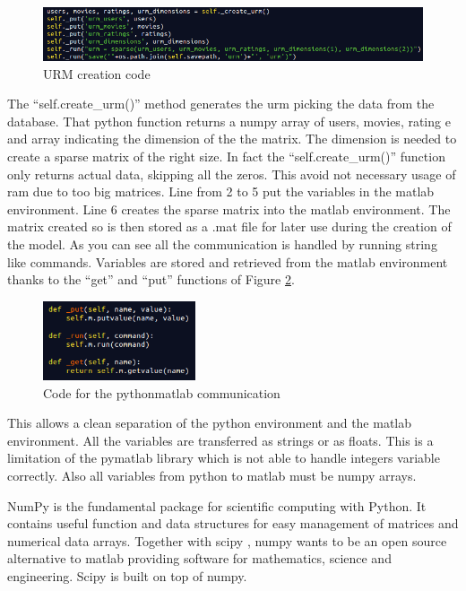 \begin{figure}
  \centering
  \includegraphics[width=\textwidth]{figures/urm_creation_code.png}
  \caption{URM creation code}
  \label{fig:urm_creation_code}
\end{figure}

The ``self.create\_urm()'' method generates the urm picking the data from the database. That python function returns a numpy array of users, movies, rating e and array indicating the dimension of the the matrix. The dimension is needed to create a sparse matrix of the right size. In fact the ``self.create\_urm()'' function only returns actual data, skipping all the zeros. This avoid not necessary usage of ram due to too big matrices. Line from 2 to 5 put the variables in the matlab environment. Line 6 creates the sparse matrix into the matlab environment. The matrix created so is then stored as a .mat file for later use during the creation of the model.
As you can see all the communication is handled by running string like commands. Variables are stored and retrieved from the matlab environment thanks to the ``get'' and ``put'' functions of Figure \ref{fig:matlab_put_get_code}.

\begin{figure}
  \centering
  \includegraphics[width=0.4\textwidth]{figures/matlab_put_get_code.png}
  \caption{Code for the python\-matlab communication}
  \label{fig:matlab_put_get_code}
\end{figure}

This allows a clean separation of the python environment and the matlab environment. All the variables are transferred as strings or as floats. This is a limitation of the pymatlab library which is not able to handle integers variable correctly. Also all variables from python to matlab must be numpy \cite{numpy} arrays.

NumPy is the fundamental package for scientific computing with Python. It contains useful function and data structures for easy management of matrices and numerical data arrays. Together with scipy \cite{scipy}, numpy wants to be an open source alternative to matlab providing software for mathematics, science and engineering. Scipy is built on top of numpy.

